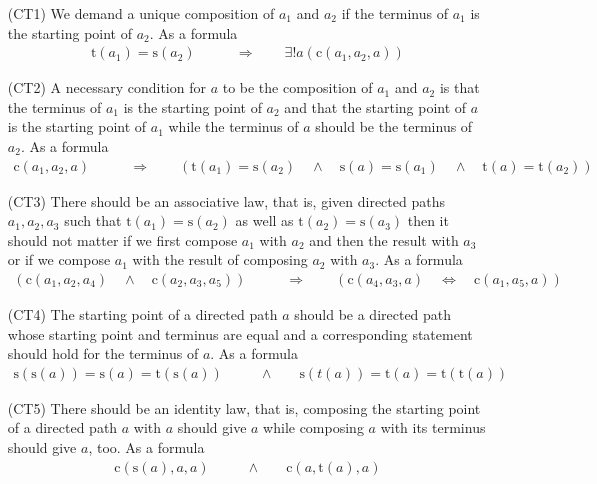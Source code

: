 \begin{enumerate}
\item[(CT1)]
We demand a unique composition of $a_{1}$ and $a_{2}$ if the terminus of $a_{1}$ is the starting point of $a_{2}$. As a formula
\begin{align*}
  \mathrm{t}(a_{1})
  =
  \mathrm{s}(a_{2})
  \qquad
  &\Rightarrow
  \qquad
  \exists!
  a
  \left(
    \mathrm{c}(a_{1},a_{2},a)
  \right)
\end{align*}
\item[(CT2)]
A necessary condition for $a$ to be the composition of $a_{1}$ and $a_{2}$ is that the terminus of $a_{1}$ is the starting point of $a_{2}$ and that the starting point of $a$ is the starting point of $a_{1}$ while the terminus of $a$ should be the terminus of $a_{2}$. As a formula
\begin{align*}
  \mathrm{c}(a_{1},a_{2},a)
  \qquad
  &\Rightarrow
  \qquad
  \left(
    \mathrm{t}(a_{1})
    =
    \mathrm{s}(a_{2})
    \quad
    \land
    \quad
    \mathrm{s}(a)
    =
    \mathrm{s}(a_{1})
    \quad
    \land
    \quad
    \mathrm{t}(a)
    =
    \mathrm{t}(a_{2})
  \right)
\end{align*}
\item[(CT3)]
There should be an associative law, that is, given directed paths $a_{1},a_{2},a_{3}$ such that $\mathrm{t}(a_{1}) = \mathrm{s}(a_{2})$ as well as $\mathrm{t}(a_{2}) = \mathrm{s}(a_{3})$ then it should not matter if we first compose $a_{1}$ with $a_{2}$ and then the result with $a_{3}$ or if we compose $a_{1}$ with the result of composing $a_{2}$ with $a_{3}$. As a formula 
\begin{align*}
  \left(
    \mathrm{c}(a_{1},a_{2},a_{4})
    \quad
    \land
    \quad
    \mathrm{c}(a_{2},a_{3},a_{5})
  \right)
  \qquad
  &\Rightarrow
  \qquad
  \left(
    \mathrm{c}(a_{4},a_{3},a)
    \quad
    \Leftrightarrow
    \quad
    \mathrm{c}(a_{1},a_{5},a)
  \right)
\end{align*}
\item[(CT4)]
The starting point of a directed path $a$ should be a directed path whose starting point and terminus are equal and a corresponding statement should hold for the terminus of $a$. As a formula
\begin{align*}
  \mathrm{s}(\mathrm{s}(a))
  =
  \mathrm{s}(a)
  =
  \mathrm{t}(\mathrm{s}(a))
  \qquad
  &\land
  \qquad
  \mathrm{s}(t(a))
  =
  \mathrm{t}(a)
  =
  \mathrm{t}(\mathrm{t}(a))
\end{align*}

\item[(CT5)]
There should be an identity law, that is, composing the starting point of a directed path $a$ with $a$ should give $a$ while composing $a$ with its terminus should give $a$, too. As a formula
\begin{align*}
  \mathrm{c}(\mathrm{s}(a),a,a)
  \qquad
  &\land
  \qquad
  \mathrm{c}(a,\mathrm{t}(a),a)
\end{align*}
\end{enumerate}
